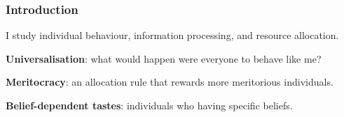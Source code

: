 \documentclass[usenames,dvipsnames,aspectratio=169,11pt]{beamer}
\begin{document}
\begin{frame}
	\maketitle

\end{frame}

\begin{frame}\frametitle{Introduction}

	I study individual behaviour, information processing, and resource allocation. \pause

	\vfill

	\begin{wideenumerate}

		\item \textbf{Universalisation}: what would happen were everyone to behave like me?

		\footnotesize{\citep{algerHomoMoralisPreference2013,laffontMacroeconomicConstraintsEconomic1975,kant1785grundlegung,roemer2019cooperate,vanleeuwenEstimatingSocialPreferences2024}}
		\pause
		\vfill

		\normalsize
		\item \textbf{Meritocracy}: an allocation rule that rewards more meritorious individuals.

		\footnotesize{\citep{cappelenFairUnfairIncome2020,fleurbaey2008fairness,kaganGeometryDesert2014,sandelTyrannyMeritWhat2020,senMeritJustice2000}} \pause
		\vfill

		\normalsize
		\item \textbf{Belief-dependent tastes}: individuals who  having specific beliefs.

		\footnotesize{\citep{benabou2016mindful,geanakoplosPsychologicalGamesSequential1989,golmanInformationAvoidance2017,leggPragmatism2024}}
	\end{wideenumerate}


\end{frame}
\end{document}
